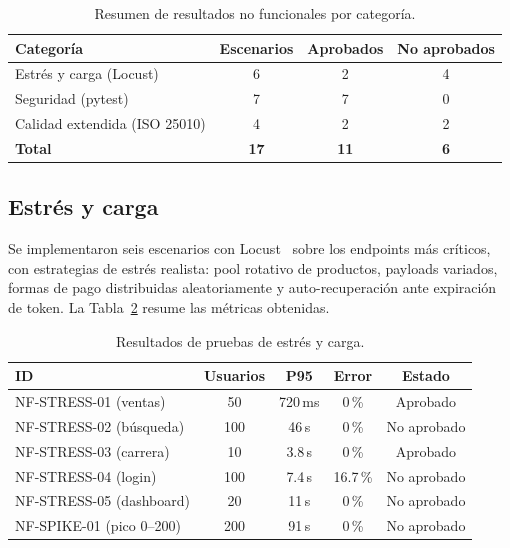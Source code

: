 \documentclass[conference]{IEEEtran}
\begin{document}
\begin{table}[htbp]
  \caption{Resumen de resultados no funcionales por categoría.}
  \label{tab:nfsummary}
  \centering
  \footnotesize
  \begin{tabular}{l c c c}
    \toprule
    \textbf{Categoría} & \textbf{Escenarios} & \textbf{Aprobados} & \textbf{No aprobados} \\
    \midrule
    Estrés y carga (Locust) & 6 & 2 & 4 \\
    Seguridad (pytest) & 7 & 7 & 0 \\
    Calidad extendida (ISO 25010) & 4 & 2 & 2 \\
    \midrule
    \textbf{Total} & \textbf{17} & \textbf{11} & \textbf{6} \\
    \bottomrule
  \end{tabular}
\end{table}

\subsection{Estrés y carga}

Se implementaron seis escenarios con Locust~\cite{locust} sobre los endpoints más críticos, con estrategias de estrés realista: pool rotativo de productos, payloads variados, formas de pago distribuidas aleatoriamente y auto-recuperación ante expiración de token. La Tabla~\ref{tab:stress} resume las métricas obtenidas.

\begin{table}[htbp]
  \caption{Resultados de pruebas de estrés y carga.}
  \label{tab:stress}
  \centering
  \footnotesize
  \begin{tabular}{l c c c c}
    \toprule
    \textbf{ID} & \textbf{Usuarios} & \textbf{P95} & \textbf{Error} & \textbf{Estado} \\
    \midrule
    NF-STRESS-01 (ventas) & 50 & 720\,ms & 0\,\% & Aprobado \\
    NF-STRESS-02 (búsqueda) & 100 & 46\,s & 0\,\% & No aprobado \\
    NF-STRESS-03 (carrera) & 10 & 3.8\,s & 0\,\% & Aprobado \\
    NF-STRESS-04 (login) & 100 & 7.4\,s & 16.7\,\% & No aprobado \\
    NF-STRESS-05 (dashboard) & 20 & 11\,s & 0\,\% & No aprobado \\
    NF-SPIKE-01 (pico 0--200) & 200 & 91\,s & 0\,\% & No aprobado \\
    \bottomrule
  \end{tabular}
\end{table}
\end{document}
